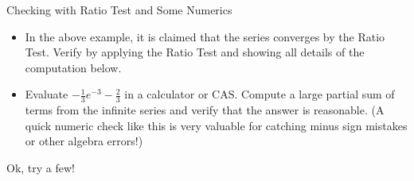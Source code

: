 \begin{exercise}{Checking with Ratio Test and Some Numerics \Coffeecup}

\begin{itemize}
\item In the above example, it is claimed that the series converges by the Ratio Test.  Verify by applying the Ratio Test and showing all details of the computation below.
\vspace*{2in}
\item Evaluate $-\frac{1}{3}e^{-3}-\frac{2}{3}$ in a calculator or CAS.  Compute a large partial sum of terms from the infinite series and verify that the answer is reasonable.  (A quick numeric check like this is very valuable for catching minus sign mistakes or other algebra errors!)
\vspace*{1in}
\end{itemize}
\end{exercise}

Ok, try a few!

